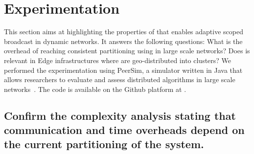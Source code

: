
\vfill


\newpage

\section{Experimentation}
\label{sec:experimentation}

This section aims at highlighting the properties of \NAME that enables
adaptive scoped broadcast in dynamic networks. It answers the
following questions: What is the overhead of reaching consistent
partitioning using \NAME in large scale networks? Does \NAME is
relevant in Edge infrastructures where \processes are geo-distributed
into clusters? We performed the experimentation using PeerSim, a
simulator written in Java that allows researchers to evaluate and
assess distributed algorithms in large scale
networks~\cite{montresor2009peersim}. The code is available on the
Github platform at
.

\subsection{Confirm the complexity analysis stating that
  communication and time overheads depend on the current partitioning
  of the system.}

